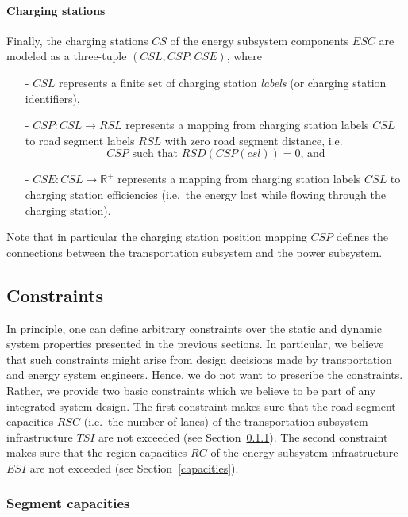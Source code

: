 
\paragraph{Charging stations}
\label{charging_stations}

Finally, the charging stations $CS$ of the energy subsystem components $ESC$ are modeled as a three-tuple $(CSL, CSP, CSE)$, where
\begin{itemize}
	\item[-] $CSL$ represents a finite set of charging station \textit{labels} (or charging station identifiers),
	\item[-] $CSP: CSL \rightarrow RSL$ represents a mapping from charging station labels $CSL$ to road segment labels $RSL$ with zero road segment distance, i.e.\
	\[
		CSP \textrm{ such that } RSD(CSP(csl)) = 0 \textrm{, and}
	\]
	\item[-] $CSE: CSL \rightarrow \mathbb{R}^+$ represents a mapping from charging station labels $CSL$ to charging station efficiencies (i.e.\ the energy lost while flowing through the charging station).
\end{itemize}
Note that in particular the charging station position mapping $CSP$ defines the connections between the transportation subsystem and the power subsystem.


\subsection{Constraints}
\label{constraints}

In principle, one can define arbitrary constraints over the static and dynamic system properties presented in the previous sections. In particular, we believe that such constraints might arise from design decisions made by transportation and energy system engineers. Hence, we do not want to prescribe the constraints. Rather, we provide two basic constraints which we believe to be part of any integrated system design. The first constraint makes sure that the road segment capacities $RSC$ (i.e.\ the number of lanes) of the transportation subsystem infrastructure $TSI$ are not exceeded (see Section~\ref{collisions}). The second constraint makes sure that the region capacities $RC$ of the energy subsystem infrastructure $ESI$ are not exceeded (see Section~\ref{capacities}).

\subsubsection{Segment capacities}
\label{collisions}

